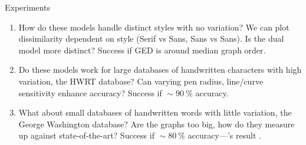 \begin{frame}{Experiments}
	\begin{enumerate}[<alert@+>]
		\item How do these models handle distinct styles with no variation?
		We can plot dissimilarity dependent on style (Serif vs Sans, Sans vs Sans).
		Is the dual model more distinct?
		Success if GED is around median graph order.
		
		\item Do these models work for large databases of handwritten characters with high variation, the HWRT database?
		Can varying pen radius, line/curve sensitivity enhance accuracy?
		Success if ${}\sim\SI{90}{\percent}$ accuracy.
		
		\item What about small databases of handwritten words with little variation, the George Washington database?
		Are the graphs too big, how do they measure up against state-of-the-art?
		Success if ${}\sim\SI{80}{\percent}$ accuracy---\citeauthor{Graphs-Handwriting}'s result \cite{Graphs-Handwriting}.
	\end{enumerate}
\end{frame}

